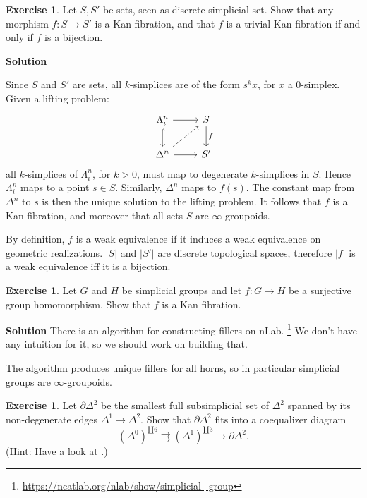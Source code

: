 \documentclass[10pt,a4paper,reqno,oneside]{book} %
\theoremstyle{plain}
\theoremstyle{definition}
\newtheorem{exercise}[thm]{Exercise}
\theoremstyle{remark}
\numberwithin{equation}{section}
\begin{document}
\begin{exercise}
	Let $S, S'$ be sets, seen as discrete simplicial set.
	Show that any morphism $f \colon S \to S'$ is a Kan fibration, and that $f$ is a trivial Kan fibration if and only if $f$ is a bijection.
\end{exercise}

\noindent
\textbf{Solution}

\noindent
Since $S$ and $S'$ are sets, all $k$-simplices are of the form $s^k x$, for $x$ a 0-simplex. Given a lifting problem:
	\[ \begin{tikzcd}
		\Lambda^n_i \arrow{r} \arrow[hook]{d} & S\arrow{d}{f} \\
		\Delta^n \arrow[dashed]{ur} \arrow{r} & S'
	\end{tikzcd} \]
all $k$-simplices of $\Lambda^n_i$, for $k>0$, must map to degenerate $k$-simplices in $S$. Hence $\Lambda^n_i$ maps to a
point $s\in S$. Similarly, $\Delta^n$ maps to $f(s)$. The constant map from $\Delta^n$ to $s$ is then the unique 
solution to the lifting problem. It follows that $f$ is a Kan fibration, and moreover that all sets $S$ are $\infty$-groupoids.

By definition, $f$ is a weak equivalence if it induces a weak equivalence on geometric realizations. $|S|$ and $|S'|$ are discrete
topological spaces, therefore $|f|$ is a weak equivalence iff it is a bijection.

\begin{exercise}
	Let $G$ and $H$ be simplicial groups and let $f \colon G \to H$ be a surjective group homomorphism.
	Show that $f$ is a Kan fibration.
\end{exercise}

\noindent
\textbf{Solution}
There is an algorithm for constructing fillers on nLab.
\footnote{\url{https://ncatlab.org/nlab/show/simplicial+group}}
We don't have any intuition for it, so we should work on building that.

The algorithm produces unique fillers for all horns, so in particular simplicial groups are $\infty$-groupoids.

\begin{exercise}
	Let $\partial \Delta^2$ be the smallest full subsimplicial set of $\Delta^2$ spanned by its non-degenerate edges $\Delta^1 \to \Delta^2$.
	Show that $\partial \Delta^2$ fits into a coequalizer diagram
	\[ (\Delta^0)^{\amalg 6} \rightrightarrows (\Delta^1)^{\amalg 3} \to \partial \Delta^2 . \]
	(Hint: Have a look at \cite[Theorem III.3.1]{Gabriel_Zisman_Calculus_of_fractions}.)
\end{exercise}
\end{document}

